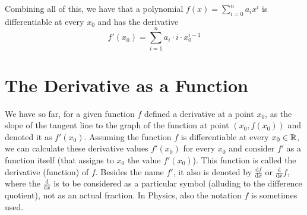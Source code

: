 Combining all of this, we have that a polynomial $f(x)=\sum_{i=0}^n a_ix^i$
is differentiable at every $x_0$ and has the derivative
\[
f'(x_0)=\sum_{i=1}^n a_i\cdot i\cdot x_0^{i-1}
\]

\section{The Derivative as a Function}

We have so far, for a given function $f$ defined a derivative at a point
$x_0$, as the slope of the tangent line to the graph of the function at
point $(x_0,f(x_0))$ and denoted it as $f'(x_0)$. Assuming the function $f$
is differentiable at every
$x_0\in{\mathbb R}$, we can calculate these derivative values $f'(x_0)$ for every
$x_0$ and consider $f'$ as a function itself (that assigns to $x_0$ the
value $f'(x_0)$). This function is called the derivative (function) of $f$.
Besides the name $f'$, it also is denoted by 
$\displaystyle\frac{\mbox{d}f}{\mbox{d}x}$ or
$\displaystyle\frac{\mbox{d}}{\mbox{d}x} f$, where the
$\frac{\mbox{d}}{\mbox{d}x}$ is to be considered as a particular symbol
(alluding to the difference quotient), not
as an actual fraction. In Physics, also the notation $\dot f$ is sometimes
used.

